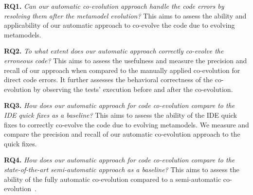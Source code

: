 \blue{}
\textbf{RQ1.}  \emph{Can our automatic co-evolution approach handle the code errors by resolving them after the metamodel evolution?} This aims to assess the ability and applicability of our automatic approach to co-evolve the code due to evolving metamodels.  %


\textbf{RQ2.} \emph{To what extent does our automatic approach correctly co-evolve the erroneous code?} This aims to assess the usefulness and measure the precision and recall of our approach when compared to the manually applied co-evolution for direct code errors. It further assesses the behavioral correctness of the co-evolution by observing the tests' execution before and after the co-evolution. %


\textbf{RQ3.} \emph{How does our automatic approach for code co-evolution compare to the IDE quick fixes as a baseline?} 
This aims to assess the ability of the IDE quick fixes to correctly co-evolve the code due to evolving metamodels. We measure and compare the precision and recall of our automatic co-evolution approach to the quick fixes.   

\textbf{RQ4.} \emph{How does our automatic approach for code co-evolution compare to the state-of-the-art semi-automatic approach as a baseline?} 
This aims to assess the ability of the fully automatic co-evolution compared to a semi-automatic co-evolution~\cite{Khelladi2020}. 

